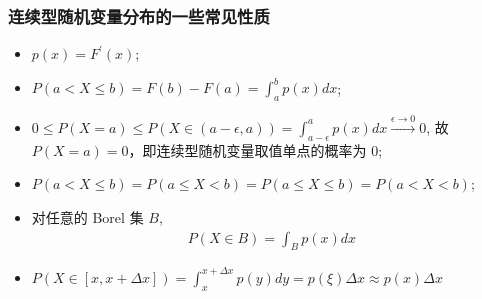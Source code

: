 \begin{frame}
	\frametitle{连续型随机变量分布的一些常见性质}
	\begin{itemize}
		\item $p(x)=F^\prime (x)$;
		\item $P(a< X\le b)=F(b)-F(a)=\int_a^bp(x)dx$;
		\item $0\le P (X=a)\le P (X\in (a-\epsilon,a))=\int_{a-\epsilon}^ap (x) dx\stackrel{\epsilon\rightarrow 0}{\longrightarrow} 0$, 故 $P (X=a)=0$，即连续型随机变量取值单点的概率为 0;
		\item $P(a<X\le b)=P(a\le X<b)=P(a\le X\le b)=P(a<X<b)$;
		\item 对任意的 Borel 集 $B$,
		      \begin{eqnarray*}
			      P(X\in B)=\int_Bp(x)dx
		      \end{eqnarray*}
		\item $P(X\in[x,x+\Delta x])=\int_x^{x+\Delta x}p(y)dy=p(\xi)\Delta x\approx p(x)\Delta x$
	\end{itemize}
\end{frame}

